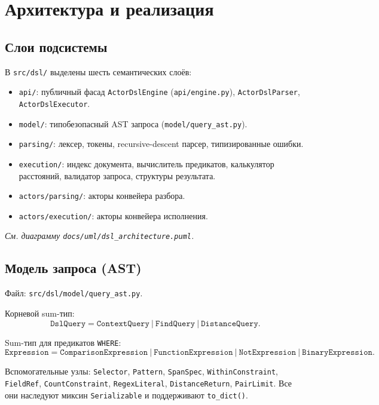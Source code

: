 \documentclass[12pt,a4paper]{article}
\newcommand{\uml}[1]{\textit{См. диаграмму \texttt{docs/uml/#1}.}}
\newcommand{\code}[1]{\texttt{#1}}
\begin{document}
\section{Архитектура и реализация}

\subsection{Слои подсистемы}

В \code{src/dsl/} выделены шесть семантических слоёв:

\begin{itemize}
  \item \code{api/}: публичный фасад \code{ActorDslEngine}
        (\code{api/engine.py}), \code{ActorDslParser}, \code{ActorDslExecutor}.
  \item \code{model/}: типобезопасный AST запроса
        (\code{model/query\_ast.py}).
  \item \code{parsing/}: лексер, токены, recursive-descent
        парсер, типизированные ошибки.
  \item \code{execution/}: индекс документа, вычислитель
        предикатов, калькулятор расстояний, валидатор запроса,
        структуры результата.
  \item \code{actors/parsing/}: акторы конвейера разбора.
  \item \code{actors/execution/}: акторы конвейера исполнения.
\end{itemize}

\uml{dsl\_architecture.puml}

\subsection{Модель запроса (AST)}

Файл: \code{src/dsl/model/query\_ast.py}.

Корневой sum-тип:
\[
\code{DslQuery} = \code{ContextQuery}\ |\ \code{FindQuery}\ |\ \code{DistanceQuery}.
\]

Sum-тип для предикатов \code{WHERE}:
\[
\code{Expression} = \code{ComparisonExpression}\ |\ \code{FunctionExpression}
\ |\ \code{NotExpression}\ |\ \code{BinaryExpression}.
\]

Вспомогательные узлы: \code{Selector}, \code{Pattern}, \code{SpanSpec},
\code{WithinConstraint}, \code{FieldRef}, \code{CountConstraint},
\code{RegexLiteral}, \code{DistanceReturn}, \code{PairLimit}. Все они
наследуют миксин \code{Serializable} и поддерживают \code{to\_dict()}.
\end{document}
